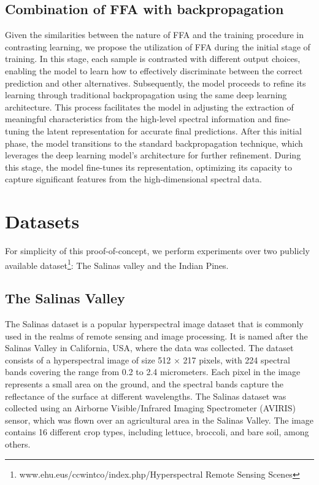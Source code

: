 \documentclass{article}
\begin{document}
\subsection{Combination of FFA with backpropagation}
Given the similarities between the nature of FFA and the training procedure in contrasting learning, we propose the utilization of FFA during the initial stage of training. In this stage, each sample is contrasted with different output choices, enabling the model to learn how to effectively discriminate between the correct prediction and other alternatives. Subsequently, the model proceeds to refine its learning through traditional backpropagation using the same deep learning architecture. This process facilitates the model in adjusting the extraction of meaningful characteristics from the high-level spectral information and fine-tuning the latent representation for accurate final predictions.
After this initial phase, the model transitions to the standard backpropagation technique, which leverages the deep learning model's architecture for further refinement. During this stage, the model fine-tunes its representation, optimizing its capacity to capture significant features from the high-dimensional spectral data.





\section{Datasets}\label{sec: Datasets}
For simplicity of this proof-of-concept, we perform experiments over two publicly available dataset\footnote{www.ehu.eus/ccwintco/index.php/Hyperspectral Remote Sensing Scenes}: The Salinas valley and the Indian Pines.
\subsection{The Salinas Valley}
The Salinas dataset is a popular hyperspectral image dataset that is commonly used in the realms of remote sensing and image processing. It is named after the Salinas Valley in California, USA, where the data was collected. The dataset consists of a hyperspectral image of size 512 $\times$ 217 pixels, with 224 spectral bands covering the range from 0.2 to 2.4 micrometers. Each pixel in the image represents a small area on the ground, and the spectral bands capture the reflectance of the surface at different wavelengths. The Salinas dataset was collected using an Airborne Visible/Infrared Imaging Spectrometer (AVIRIS) sensor, which was flown over an agricultural area in the Salinas Valley. The image contains 16 different crop types, including lettuce, broccoli, and bare soil, among others.
\end{document}
